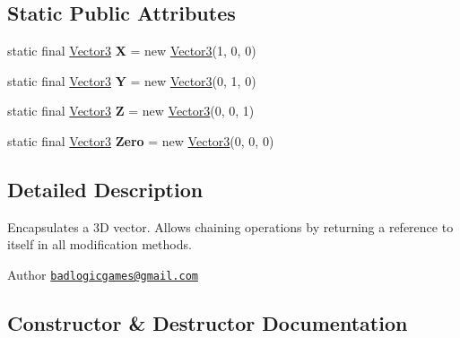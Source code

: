 \subsection*{Static Public Attributes}
\begin{DoxyCompactItemize}
\item 
\hypertarget{classairhockeyjava_1_1util_1_1_vector3_afdb0c378d02046f183e45f1e72b8c29b}{}static final \hyperlink{classairhockeyjava_1_1util_1_1_vector3}{Vector3} {\bfseries X} = new \hyperlink{classairhockeyjava_1_1util_1_1_vector3}{Vector3}(1, 0, 0)\label{classairhockeyjava_1_1util_1_1_vector3_afdb0c378d02046f183e45f1e72b8c29b}

\item 
\hypertarget{classairhockeyjava_1_1util_1_1_vector3_a3f9e2d3f14fd2c82e0ccd10447547584}{}static final \hyperlink{classairhockeyjava_1_1util_1_1_vector3}{Vector3} {\bfseries Y} = new \hyperlink{classairhockeyjava_1_1util_1_1_vector3}{Vector3}(0, 1, 0)\label{classairhockeyjava_1_1util_1_1_vector3_a3f9e2d3f14fd2c82e0ccd10447547584}

\item 
\hypertarget{classairhockeyjava_1_1util_1_1_vector3_a1b574e043f5a6e61af4a7410631d1958}{}static final \hyperlink{classairhockeyjava_1_1util_1_1_vector3}{Vector3} {\bfseries Z} = new \hyperlink{classairhockeyjava_1_1util_1_1_vector3}{Vector3}(0, 0, 1)\label{classairhockeyjava_1_1util_1_1_vector3_a1b574e043f5a6e61af4a7410631d1958}

\item 
\hypertarget{classairhockeyjava_1_1util_1_1_vector3_a5c10976b741155063478e628988046be}{}static final \hyperlink{classairhockeyjava_1_1util_1_1_vector3}{Vector3} {\bfseries Zero} = new \hyperlink{classairhockeyjava_1_1util_1_1_vector3}{Vector3}(0, 0, 0)\label{classairhockeyjava_1_1util_1_1_vector3_a5c10976b741155063478e628988046be}

\end{DoxyCompactItemize}


\subsection{Detailed Description}
Encapsulates a 3\+D vector. Allows chaining operations by returning a reference to itself in all modification methods. \begin{DoxyAuthor}{Author}
\href{mailto:badlogicgames@gmail.com}{\tt badlogicgames@gmail.\+com} 
\end{DoxyAuthor}


\subsection{Constructor \& Destructor Documentation}
\hypertarget{classairhockeyjava_1_1util_1_1_vector3_aa410d58eb928f976d4d14e861c22940d}{}
